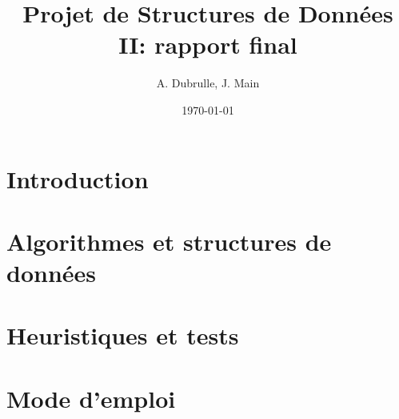 \documentclass[a4paper, 12pt]{article}
\title{Projet de Structures de Données II: rapport final}
\author{A. Dubrulle, J. Main}
\date{\today}
\theoremstyle{definition} \newtheorem{df}{D\'{e}finition}[section]
\theoremstyle{definition} \newtheorem{ex}[df]{Exemple}
\theoremstyle{definition} \newtheorem{thm}[df]{Th\'{e}or\`{e}me}
\theoremstyle{definition} \newtheorem{cor}[df]{Corollaire}
\theoremstyle{definition} \newtheorem{lem}[df]{Lemme}
\theoremstyle{definition} \newtheorem{obs}[df]{Observation}
\theoremstyle{definition} \newtheorem{prop}[df]{Proposition}
\theoremstyle{definition} \newtheorem{rem}[df]{Remarque}
\begin{document}
\maketitle
\tableofcontents
\section{Introduction}


\section{Algorithmes et structures de données}

\section{Heuristiques et tests}


\section{Mode d'emploi}



%
\end{document}
